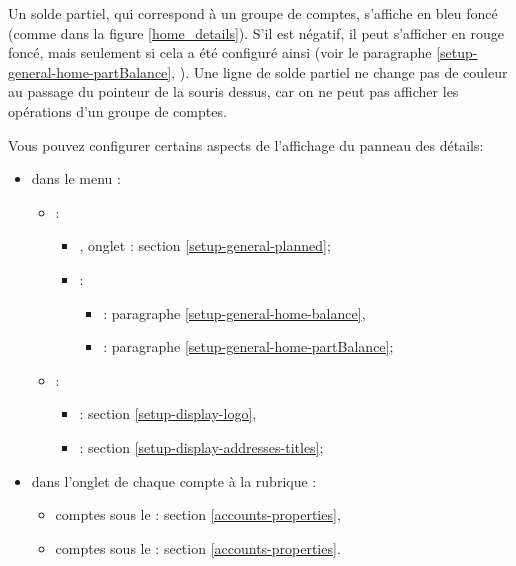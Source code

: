 Un solde partiel, qui correspond à un groupe de comptes, s'affiche en \textcolor[RGB]{40,40,255}{bleu foncé} (comme dans la figure \vref{home_details}). S'il est négatif, il peut s'afficher en \textcolor[RGB]{153,0,0}{rouge foncé}, mais seulement si cela a été configuré ainsi (voir le paragraphe \vref{setup-general-home-partBalance}, ). Une ligne de solde partiel ne change pas de couleur au passage du pointeur de la souris dessus, car on ne peut pas afficher les opérations d'un groupe de comptes.

Vous pouvez configurer certains aspects de l'affichage du panneau des détails:
\begin{itemize}
	\item dans le menu :
		\begin{itemize}
			\item {}:
				\begin{itemize}
					\item {}, onglet : section \vref{setup-general-planned};
					\item {}:
						\begin{itemize}
							\item {}: paragraphe \vref{setup-general-home-balance},
							\item {}: paragraphe \vref{setup-general-home-partBalance};
						\end{itemize}
				\end{itemize}
			\item {}:
				\begin{itemize}
					\item {}: section \vref{setup-display-logo},
					\item {}: section \vref{setup-display-addresses-titles};
				\end{itemize}
		\end{itemize}
	\item dans l'onglet  de chaque compte à la rubrique :
		\begin{itemize}
			 \item comptes sous le : section \vref{accounts-properties},
			 \item comptes sous le : section \vref{accounts-properties}.
		\end{itemize}
\end{itemize}

